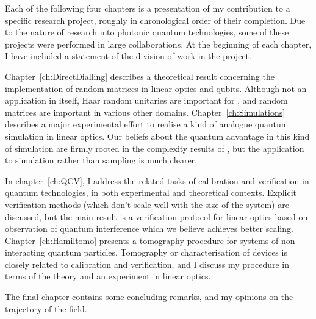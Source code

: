 Each of the following four chapters is a presentation of my contribution to a
specific research project, roughly in chronological order of their completion.
Due to the nature of research into photonic quantum technologies, some of these
projects were performed in large collaborations. At the beginning of each
chapter, I have included a statement of the division of work in the project.

Chapter~\ref{ch:DirectDialling} describes a theoretical result concerning the
implementation of random matrices in linear optics and qubits. Although not an
application in itself, Haar random unitaries are important for \bosonsampling{},
and random matrices are important in various other domains.
Chapter~\ref{ch:Simulations} describes a major experimental effort to realise a
kind of analogue quantum simulation in linear optics. Our beliefs about the
quantum advantage in this kind of simulation are firmly rooted in the
complexity results of \bosonsampling{}, but the application to simulation rather
than sampling is much clearer.

In chapter~\ref{ch:QCV}, I address the related tasks of calibration and
verification in quantum technologies, in both experimental and theoretical
contexts. Explicit verification methods (which don't scale well with the size of
the system) are discussed, but the main result is a verification protocol for
linear optics based on observation of quantum interference which we believe
achieves better scaling. Chapter~\ref{ch:Hamiltomo} presents a tomography
procedure for systems of non-interacting quantum particles. Tomography or
characterisation of devices is closely related to calibration and verification,
and I discuss my procedure in terms of the theory and an experiment in linear
optics.

The final chapter contains some concluding remarks, and my opinions on the
trajectory of the field.
